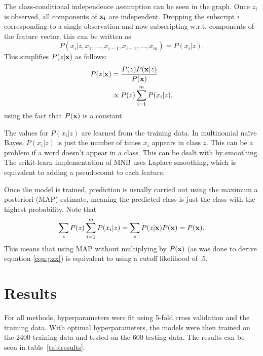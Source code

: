 \documentclass{article} %
\begin{document}
	The class-conditional independence assumption can be seen in the graph. Once $z_i$ is observed, all components of $\bf x_i$ are independent. Dropping the subscript $i$ corresponding to a single observation and now subscripting w.r.t. components of the feature vector, this can be written as 
	\begin{equation}
	P(x_i|z, x_1,\dots,x_{i-1}, x_{i+1}, \dots, x_m) = P(x_i|z).
	\end{equation}
	This simplifies $P(z|{\bf x})$ as follows:
	\begin{align}
	P(z|{\bf x}) &= \frac{P(z)P({\bf x}|z)}{P({\bf x})} \nonumber\\
	&\propto P(z)\sum_{i=1}^mP(x_i|z), \label{eqn:pzx}
	\end{align}
	using the fact that $P({\bf x})$ is a constant.
	
	The values for $P(x_i|z)$ are learned from the training data. In multinomial na\"ive Bayes, $P(x_i|z)$ is just the number of times $x_i$ appears in class $z$. This can be a problem if a word doesn't appear in a class. This can be dealt with by smoothing. The scikit-learn implementation of MNB uses Laplace smoothing, which is equivalent to adding a pseudocount to each feature. 
	
	Once the model is trained, prediction is usually carried out using the maximum a posteriori (MAP) estimate, meaning the predicted class is just the class with the highest probability. Note that 
	\begin{align}
	\sum_zP(z)\sum_{i=1}^mP(x_i|z) = \sum_zP(z|{\bf x})P({\bf x}) = P({\bf x}).
	\end{align}
	This means that using MAP without multiplying by $P({\bf x})$ (as was done to derive equation \ref{eqn:pzx}) is equivalent to using a cutoff likelihood of .5.
	
	\section{Results}
	
	For all methods, hyperparameters were fit using 5-fold cross validation and the training data. With optimal hyperparameters, the models were then trained on the 2400 training data and tested on the 600 testing data. The results can be seen in table~\ref{tab:results}.
	
\end{document}
